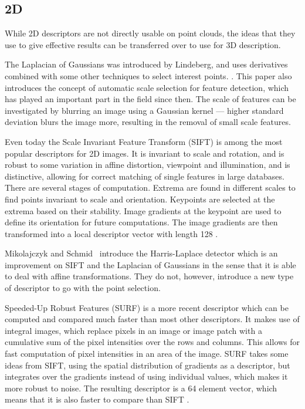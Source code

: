 \documentclass[11pt,a4paper]{kth-mag}
\begin{document}
\subsection{2D}
While 2D descriptors are not directly usable on point clouds, the ideas that
they use to give effective results can be transferred over to use for 3D
description.

The Laplacian of Gaussians was introduced by Lindeberg, and uses derivatives
combined with some other techniques to select interest points.
\cite{lindeberg1998feature}. This paper also introduces the concept of automatic
scale selection for feature detection, which has played an important part in the
field since then. The scale of features can be investigated by blurring an image
using a Gaussian kernel --- higher standard deviation blurs the image more,
resulting in the removal of small scale features.

Even today the Scale Invariant Feature Transform (SIFT) is among the most
popular descriptors for 2D images. It is invariant to scale and rotation, and is
robust to some variation in affine distortion, viewpoint and illumination, and
is distinctive, allowing for correct matching of single features in large
databases. There are several stages of computation. Extrema are found in
different scales to find points invariant to scale and orientation. Keypoints
are selected at the extrema based on their stability. Image gradients at the
keypoint are used to define its orientation for future computations. The image
gradients are then transformed into a local descriptor vector with length 128
\cite{lowe2004distinctive}.

Mikolajczyk and Schmid~\cite{mikolajczyk2004scale} introduce the Harris-Laplace
detector which is an improvement on SIFT \cite{lowe2004distinctive} and the
Laplacian of Gaussians \cite{lindeberg1998feature} in the sense that it is able
to deal with affine transformations. They do not, however, introduce a new type
of descriptor to go with the point selection. 

Speeded-Up Robust Features (SURF) is a more recent descriptor which can be
computed and compared much faster than most other descriptors. It makes use of
integral images, which replace pixels in an image or image patch with a
cumulative sum of the pixel intensities over the rows and columns. This allows
for fast computation of pixel intensities in an area of the image. SURF takes
some ideas from SIFT, using the spatial distribution of gradients as a
descriptor, but integrates over the gradients instead of using individual
values, which makes it more robust to noise. The resulting descriptor is a 64
element vector, which means that it is also faster to compare than SIFT
\cite{bay2008speeded}.
\end{document}
